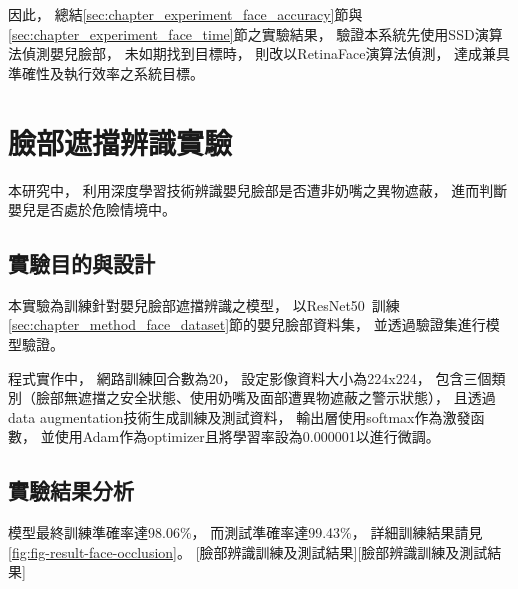 \documentclass[class=NCU_thesis, crop=false]{standalone}
\begin{document}
因此，
總結\ref{sec:chapter_experiment_face_accuracy}節與\ref{sec:chapter_experiment_face_time}節之實驗結果，
驗證本系統先使用SSD演算法偵測嬰兒臉部，
未如期找到目標時，
則改以RetinaFace演算法偵測，
達成兼具準確性及執行效率之系統目標。

\section{臉部遮擋辨識實驗}
本研究中，
利用深度學習技術辨識嬰兒臉部是否遭非奶嘴之異物遮蔽，
進而判斷嬰兒是否處於危險情境中。

\subsection{實驗目的與設計}
本實驗為訓練針對嬰兒臉部遮擋辨識之模型，
以ResNet50~\cite{he_deep_2016}訓練\ref{sec:chapter_method_face_dataset}節的嬰兒臉部資料集，
並透過驗證集進行模型驗證。

程式實作中，
網路訓練回合數為20，
設定影像資料大小為224x224，
包含三個類別（臉部無遮擋之安全狀態、使用奶嘴及面部遭異物遮蔽之警示狀態），
且透過data augmentation技術生成訓練及測試資料，
輸出層使用softmax作為激發函數，
並使用Adam作為optimizer且將學習率設為0.000001以進行微調。

\subsection{實驗結果分析}
模型最終訓練準確率達98.06\%，
而測試準確率達99.43\%，
詳細訓練結果請見\cref{fig:fig-result-face-occlusion}。
[臉部辨識訓練及測試結果][臉部辨識訓練及測試結果]
\end{document}
